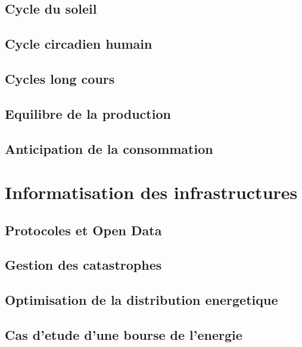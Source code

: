 \section{Cycle du soleil}
\lipsum
\section{Cycle circadien humain}
\lipsum
\section{Cycles long cours}
\lipsum
\section{Equilibre de la production}
\lipsum
\section{Anticipation de la consommation}
\lipsum



\chapter{Informatisation des infrastructures}
\section{Protocoles et Open Data}
\lipsum
\section{Gestion des catastrophes}
\lipsum
\section{Optimisation de la distribution energetique}
\lipsum
\section{Cas d'etude d'une bourse de l'energie}
\lipsum
